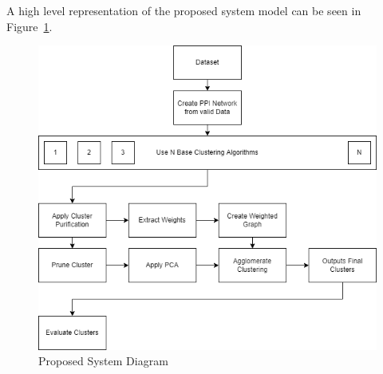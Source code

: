 A high level representation of the proposed system model can be seen in Figure~\ref{fig: systemdiag}.
\begin{figure}[h!]
    \centering
\includegraphics[scale=0.7]{Documentation/Final-Report-Kavish-1/system_diagram1.png}
\caption{Proposed System Diagram}
\label{fig: systemdiag}
\end{figure}


